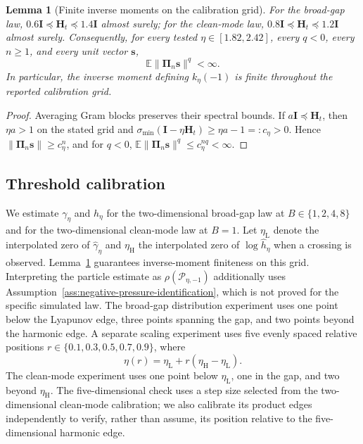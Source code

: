 \documentclass[11pt]{article}
\newtheorem{lemma}[theorem]{Lemma}
\theoremstyle{definition}
\newcommand{\E}{\mathbb E}
\newcommand{\Id}{\mathbf I}
\newcommand{\svec}{\mathbf s}
\newcommand{\Hvec}{\mathbf H}
\newcommand{\PiProd}{\boldsymbol\Pi}
\begin{document}
\begin{lemma}[Finite inverse moments on the calibration grid]
\label{lem:inverse-moment-finite}
For the broad-gap law,
$0.6\Id\preceq\Hvec_t\preceq1.4\Id$ almost surely; for the clean-mode law,
$0.8\Id\preceq\Hvec_t\preceq1.2\Id$ almost surely.  Consequently, for every
tested $\eta\in[1.82,2.42]$, every $q<0$, every $n\geq1$, and every unit
vector $\svec$,
\[
  \E\|\PiProd_n\svec\|^q<\infty.
\]
In particular, the inverse moment defining $k_\eta(-1)$ is finite throughout
the reported calibration grid.
\end{lemma}

\begin{proof}
Averaging Gram blocks preserves their spectral bounds.  If
$a\Id\preceq\Hvec_t$, then $\eta a>1$ on the stated grid and
$\sigma_{\min}(\Id-\eta\Hvec_t)\geq\eta a-1=:c_\eta>0$.  Hence
$\|\PiProd_n\svec\|\geq c_\eta^n$, and for $q<0$,
$\E\|\PiProd_n\svec\|^q\leq c_\eta^{nq}<\infty$.
\end{proof}

\subsection{Threshold calibration}

We estimate $\gamma_\eta$ and $h_\eta$ for the two-dimensional broad-gap law
at $B\in\{1,2,4,8\}$ and for the two-dimensional clean-mode law at $B=1$.
Let
$\eta_{\mathrm L}$ denote the interpolated zero of $\widehat\gamma_\eta$ and
$\eta_{\mathrm H}$ the interpolated zero of
$\log\widehat h_\eta$ when a crossing is observed.
Lemma~\ref{lem:inverse-moment-finite} guarantees inverse-moment finiteness on
this grid.  Interpreting the particle estimate as
$\rho(\mathcal P_{\eta,-1})$ additionally uses
Assumption~\ref{ass:negative-pressure-identification}, which is not proved
for the specific simulated law.  The broad-gap distribution experiment uses
one point below the Lyapunov edge, three points spanning the gap, and two
points beyond the harmonic edge.  A separate scaling experiment uses five evenly spaced
relative positions $r\in\{0.1,0.3,0.5,0.7,0.9\}$, where
\begin{equation}
 \eta(r)=\eta_{\mathrm L}
 +r(\eta_{\mathrm H}-\eta_{\mathrm L}).
 \label{eq:relative-grid}
\end{equation}
The clean-mode experiment uses one point below $\eta_{\mathrm L}$, one in
the gap, and two beyond $\eta_{\mathrm H}$.  The five-dimensional check uses
a step size selected from the two-dimensional clean-mode calibration; we
also calibrate its product edges independently to verify, rather than assume,
its position relative to the five-dimensional harmonic edge.
\end{document}
